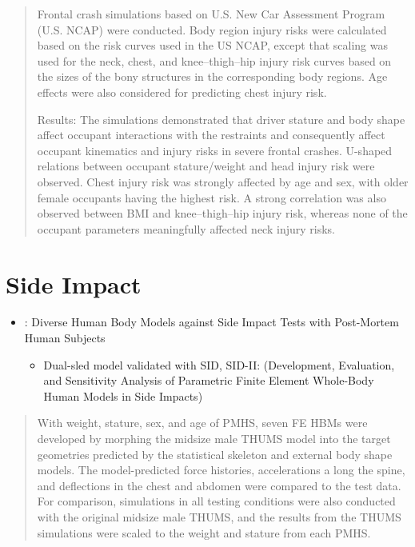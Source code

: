 \documentclass[]{book}
\providecommand{\tightlist}{%
  \setlength{\itemsep}{0pt}\setlength{\parskip}{0pt}}
\begin{document}
\begin{quote}
Frontal crash simulations based on U.S. New Car Assessment Program (U.S. NCAP) were conducted. Body region injury risks were calculated based on the risk curves used in the US NCAP, except that scaling was used for the neck, chest, and knee--thigh--hip injury risk curves based on the sizes of the bony structures in the corresponding body regions. Age effects were also considered for predicting chest injury risk.

Results: The simulations demonstrated that driver stature and body shape affect occupant interactions with the restraints and consequently affect occupant kinematics and injury risks in severe frontal crashes. U-shaped relations between occupant stature/weight and head injury risk were observed. Chest injury risk was strongly affected by age and sex, with older female occupants having the highest risk. A strong correlation was also observed between BMI and knee--thigh--hip injury risk, whereas none of the occupant parameters meaningfully affected neck injury risks.
\end{quote}

\hypertarget{side-impact}{%
\section{Side Impact}\label{side-impact}}

\begin{itemize}
\tightlist
\item
  \citet{Hwang2019}: Diverse Human Body Models against Side Impact Tests with Post-Mortem Human Subjects

  \begin{itemize}
  \tightlist
  \item
    Dual-sled model validated with SID, SID-II: \citet{Hwang2016} (Development, Evaluation, and Sensitivity Analysis of Parametric Finite Element Whole-Body Human Models in Side Impacts)
  \end{itemize}
\end{itemize}

\begin{quote}
With weight, stature, sex, and age of PMHS, seven FE HBMs were developed by morphing the midsize male THUMS model into the target geometries predicted by the statistical skeleton and external body shape models. The model-predicted force histories, accelerations a long the spine, and deflections in the chest and abdomen were compared to the test data. For comparison, simulations in all testing conditions were also conducted with the original midsize male THUMS, and the results from the THUMS simulations were scaled to the weight and stature from each PMHS.
\end{quote}
\end{document}

